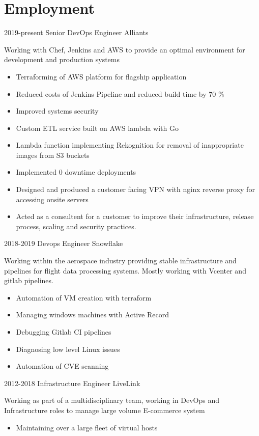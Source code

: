 \documentclass[]{friggeri-cv-a4}
\begin{document}
\section{Employment}
 \begin{entrylist}
  \entry
  	{2019-present}
  	{Senior DevOps Engineer}
  	{Alliants}
  	{Working with Chef, Jenkins and AWS to provide an optimal environment for development and production systems
      \begin{itemize}
        \item Terraforming of AWS platform for flagship application
        \item Reduced costs of Jenkins Pipeline and reduced build time by 70 \%
        \item Improved systems security
        \item Custom ETL service built on AWS lambda with Go
        \item Lambda function implementing Rekognition for removal of inappropriate images from S3 buckets
        \item Implemented 0 downtime deployments
        \item Designed and produced a customer facing VPN with nginx reverse proxy for accessing onsite servers
        \item Acted as a consultent for a customer to improve their infrastructure, release process, scaling and security practices. 
      \end{itemize}}
  \entry 
  	{2018-2019}
  	{Devops Engineer}
  	{Snowflake}
  	{
      Working within the aerospace industry providing stable infrastructure and pipelines for flight data processing systems. Mostly working with Vcenter and gitlab pipelines.
      \begin{itemize}
        \item Automation of VM creation with terraform
        \item Managing windows machines with Active Record
        \item Debugging Gitlab CI pipelines
        \item Diagnosing low level Linux issues
        \item Automation of CVE scanning
      \end{itemize}
    }
  \entry
  	{2012-2018}
  	{Infrastructure Engineer}
  	{LiveLink}
  	{
      Working as part of a multidisciplinary team, working in DevOps and Infrastructure roles to manage large volume E-commerce system
    \begin{itemize}
      \item Maintaining over a large fleet of virtual hosts

\end{itemize}}
\end{entrylist}
\end{document}
